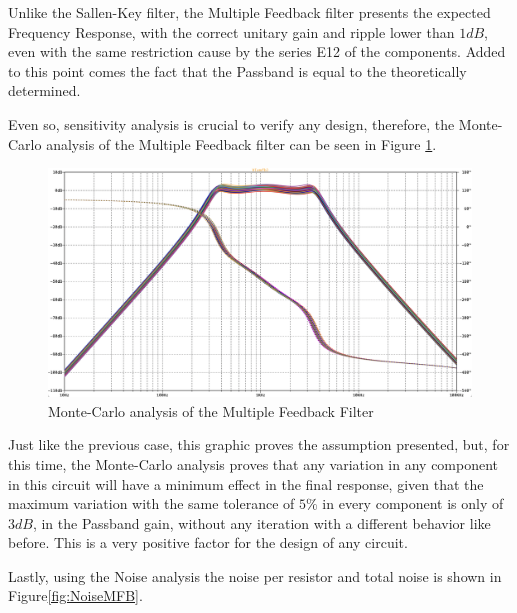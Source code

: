 Unlike the Sallen-Key filter, the Multiple Feedback filter presents the expected Frequency Response, with the correct unitary gain and ripple lower than $1dB$, even with the same restriction cause by the series E12 of the components. Added to this point comes the fact that the Passband is equal to the theoretically determined. 

Even so, sensitivity analysis is crucial to verify any design, therefore, the Monte-Carlo analysis of the Multiple Feedback filter can be seen in Figure \ref{fig:Monte-CarloMFBFilter}.

\begin{figure}[H]
    \centering
    \includegraphics*[scale = 0.25]{Images/Monte-CarloMFB.png}
    \caption{Monte-Carlo analysis of the Multiple Feedback Filter}
    \label{fig:Monte-CarloMFBFilter}
\end{figure}

Just like the previous case, this graphic proves the assumption presented, but, for this time, the Monte-Carlo analysis proves that any variation in any component in this circuit will have a minimum effect in the final response, given that the maximum variation with the same tolerance of $5\%$ in every component is only of $3dB$, in the Passband gain, without any iteration with a different behavior like before. This is a very positive factor for the design of any circuit.

Lastly, using the Noise analysis the noise per resistor and total noise is shown in Figure\ref{fig:NoiseMFB}.

